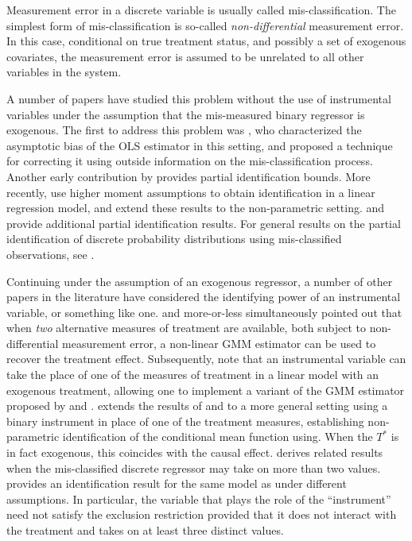 Measurement error in a discrete variable is usually called mis-classification.
The simplest form of mis-classification is so-called \emph{non-differential} measurement error.
In this case, conditional on true treatment status, and possibly a set of exogenous covariates, the measurement error is assumed to be unrelated to all other variables in the system.

A number of papers have studied this problem without the use of instrumental variables under the assumption that the mis-measured binary regressor is exogenous.
The first to address this problem was \cite{Aigner}, who characterized the asymptotic bias of the OLS estimator in this setting, and proposed a technique for correcting it using outside information on the mis-classification process.
Another early contribution by \cite{Bollinger} provides partial identification bounds.
More recently, \cite{ChenHuLewbel} use higher moment assumptions to obtain identification in a linear regression model, and \cite{ChenHuLewbel2} extend these results to the non-parametric setting. 
\cite{HasseltBollinger} and \cite{BollingerHasseltWP} provide additional partial identification results.
For general results on the partial identification of discrete probability distributions using mis-classified observations, see \cite{molinari}.

Continuing under the assumption of an exogenous regressor, a number of other papers in the literature have considered the identifying power of an instrumental variable, or something like one.
\cite{BBS} and \cite{KRS} more-or-less simultaneously pointed out that when \emph{two} alternative measures of treatment are available, both subject to non-differential measurement error, a non-linear GMM estimator can be used to recover the treatment effect.
Subsequently, \cite{FL} note that an instrumental variable can take the place of one of the measures of treatment in a linear model with an exogenous treatment, allowing one to implement a variant of the GMM estimator proposed by \cite{BBS} and \cite{KRS}.
\cite{Mahajan} extends the results of \cite{BBS} and \cite{KRS} to a more general setting using a binary instrument in place of one of the treatment measures, establishing non-parametric identification of the conditional mean function using.
When the $T^*$ is in fact exogenous, this coincides with the causal effect.
\cite{hu2008} derives related results when the mis-classified discrete regressor may take on more than two values.
\cite{Lewbel} provides an identification result for the same model as \cite{Mahajan} under different assumptions.
In particular, the variable that plays the role of the ``instrument'' need not satisfy the exclusion restriction provided that it does not interact with the treatment and takes on at least three distinct values. 

